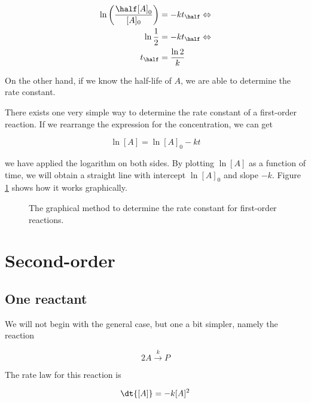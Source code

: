 \begin{align}
  \label{eq:firstOrderHalfLives}
  \ln\left(\frac{\half[A]_0}{[A]_0}\right) &= -kt_\half \Leftrightarrow \nonumber \\
  \ln\frac{1}{2} &= -kt_\half \Leftrightarrow \nonumber \\
  t_\half &= \frac{\ln2}{k}
\end{align}

On the other hand, if we know the half-life of $A$, we are able to determine the rate constant.

There exists one very simple way to determine the rate constant of a first-order reaction. If we rearrange the expression for the concentration, we can get

\begin{equation}
  \label{eq:firstOrderLinear}
  \ln[A] = \ln[A]_0 - kt
\end{equation}

\ie we have applied the logarithm on both sides. By plotting $\ln[A]$ as a function of time, we will obtain a straight line with intercept $\ln[A]_0$ and slope $-k$. Figure \ref{fig:firstOrderLinear} shows how it works graphically.

\begin{figure}
  \centering

  \caption{The graphical method to determine the rate constant for first-order reactions.}
  \label{fig:firstOrderLinear}
\end{figure}

\section{Second-order}
\label{sec:secondOrder}

\subsection{One reactant}
We will not begin with the general case, but one a bit simpler, namely the reaction

\begin{equation}
  \label{eq:secondOrderSame}
  2A \overset{k}{\rightarrow} P
\end{equation}

The rate law for this reaction is

\begin{equation}
  \label{eq:secondOrderSameVelocity}
  \dt{[A]} = -k[A]^2
\end{equation}

